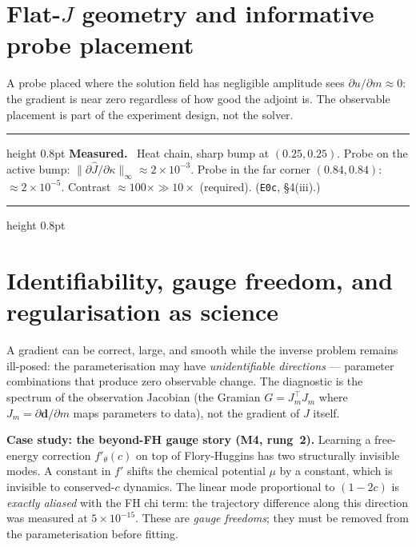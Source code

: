 \documentclass[11pt]{article}
\newenvironment{measured}{%
  \par\medskip\noindent\begin{minipage}{\linewidth}
  \hrule height 0.8pt \smallskip
  \textbf{Measured.}\ }{%
  \smallskip\hrule height 0.8pt \end{minipage}\par\medskip}
\begin{document}
\section{Flat-$J$ geometry and informative probe placement}
\label{sec:flatJ}

A probe placed where the solution field has negligible amplitude sees
$\partial u/\partial m \approx 0$: the gradient is near zero regardless of
how good the adjoint is.  The observable placement is part of the
experiment design, not the solver.

\begin{measured}
Heat chain, sharp bump at $(0.25, 0.25)$.  Probe on the active bump:
$\|\partial \hat{J}/\partial\kappa\|_\infty \approx 2 \times 10^{-3}$.
Probe in the far corner $(0.84, 0.84)$: $\approx 2 \times 10^{-5}$.
Contrast $\approx 100\times \gg 10\times$ (required).
(\texttt{E0c}, \S4(iii).)
\end{measured}

\section{Identifiability, gauge freedom, and regularisation as science}
\label{sec:identifiability}

A gradient can be correct, large, and smooth while the inverse problem
remains ill-posed: the parameterisation may have \emph{unidentifiable
directions} --- parameter combinations that produce zero observable change.
The diagnostic is the spectrum of the observation Jacobian (the Gramian
$G = J_m^\top J_m$ where $J_m = \partial \mathbf{d}/\partial m$ maps
parameters to data), not the gradient of $J$ itself.

\textbf{Case study: the beyond-FH gauge story (M4, rung~2).}
Learning a free-energy correction $f'_\theta(c)$ on top of Flory-Huggins
has two structurally invisible modes.  A constant in $f'$ shifts the
chemical potential $\mu$ by a constant, which is invisible to conserved-$c$
dynamics.  The linear mode proportional to $(1 - 2c)$ is \emph{exactly
aliased} with the FH chi term: the trajectory difference along this
direction was measured at $5 \times 10^{-15}$.  These are \emph{gauge
freedoms}; they must be removed from the parameterisation before fitting.
\end{document}
